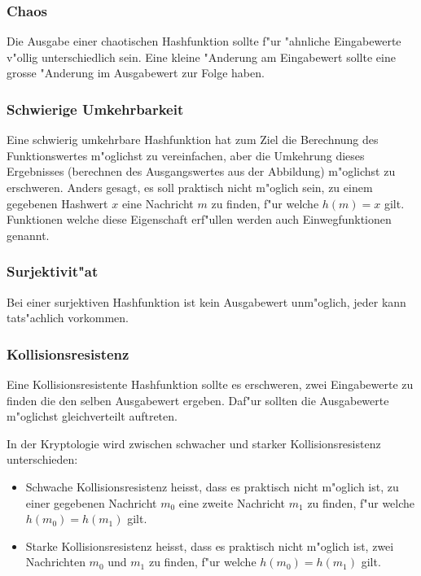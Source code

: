 \begin{refsection}
\subsubsection{Chaos}

Die Ausgabe einer chaotischen Hashfunktion sollte f"ur "ahnliche Eingabewerte
v"ollig unterschiedlich sein. Eine kleine "Anderung am Eingabewert sollte eine
grosse "Anderung im Ausgabewert zur Folge haben.

\subsubsection{Schwierige Umkehrbarkeit}

Eine schwierig umkehrbare Hashfunktion hat zum Ziel die Berechnung des
Funktionswertes m"oglichst zu vereinfachen, aber die Umkehrung dieses Ergebnisses
(berechnen des Ausgangswertes aus der Abbildung) m"oglichst zu erschweren. Anders
gesagt, es soll praktisch nicht m"oglich sein, zu einem gegebenen Hashwert $x$
eine Nachricht $m$ zu finden, f"ur welche $h(m) = x$ gilt.  Funktionen welche
diese Eigenschaft erf"ullen werden auch Einwegfunktionen genannt.

\subsubsection{Surjektivit"at}

Bei einer surjektiven Hashfunktion ist kein Ausgabewert unm"oglich, jeder kann
tats"achlich vorkommen.

\subsubsection{Kollisionsresistenz}
\label{crypto:kollisionsresistenz}

Eine Kollisionsresistente Hashfunktion sollte es erschweren, zwei Eingabewerte
zu finden die den selben Ausgabewert ergeben. Daf"ur sollten die Ausgabewerte
m"oglichst gleichverteilt auftreten.

In der Kryptologie wird zwischen schwacher und starker Kollisionsresistenz
unterschieden\cite{crypto:stephan2011kryptographie}:

\begin{itemize}
		\item Schwache Kollisionsresistenz heisst, dass es praktisch nicht m"oglich
			ist, zu einer gegebenen Nachricht $m_0$ eine zweite Nachricht $m_1$ zu finden, f"ur
			welche $h(m_0) = h(m_1)$ gilt.
		\item Starke Kollisionsresistenz heisst, dass es praktisch nicht m"oglich
			ist, zwei Nachrichten $m_0$ und $m_1$ zu finden, f"ur welche $h(m_0) =
			h(m_1)$ gilt.
\end{itemize}


\end{refsection}
